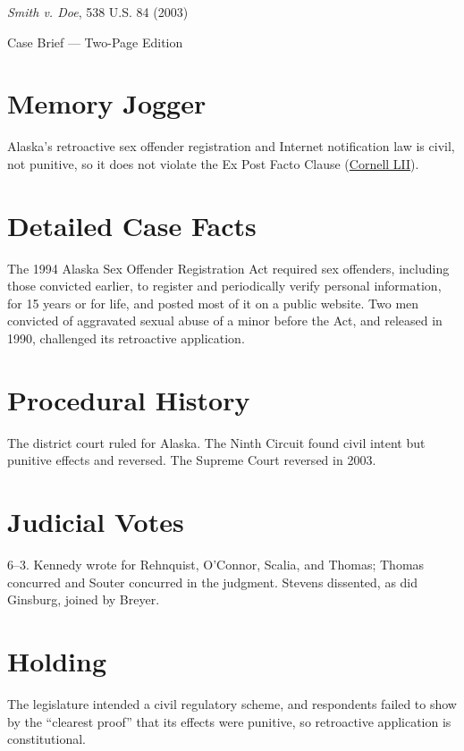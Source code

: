 \documentclass[12pt]{article}
\begin{document}
\begin{center}
{\LARGE \textit{Smith v. Doe}, 538 U.S. 84 (2003)\par}
\vspace{0.5em}
{\large Case Brief --- Two-Page Edition\par}
\end{center}

\section{Memory Jogger}
Alaska's retroactive sex offender registration and Internet notification law is civil, not punitive, so it does not violate the Ex Post Facto Clause (\href{https://www.law.cornell.edu/supct/html/01-729.ZO.html}{Cornell LII}).

\section{Detailed Case Facts}
The 1994 Alaska Sex Offender Registration Act required sex offenders, including those convicted earlier, to register and periodically verify personal information, for 15 years or for life, and posted most of it on a public website. Two men convicted of aggravated sexual abuse of a minor before the Act, and released in 1990, challenged its retroactive application.

\section{Procedural History}
The district court ruled for Alaska. The Ninth Circuit found civil intent but punitive effects and reversed. The Supreme Court reversed in 2003.

\section{Judicial Votes}
6--3. Kennedy wrote for Rehnquist, O'Connor, Scalia, and Thomas; Thomas concurred and Souter concurred in the judgment. Stevens dissented, as did Ginsburg, joined by Breyer.

\section{Holding}
The legislature intended a civil regulatory scheme, and respondents failed to show by the ``clearest proof'' that its effects were punitive, so retroactive application is constitutional.
\end{document}
